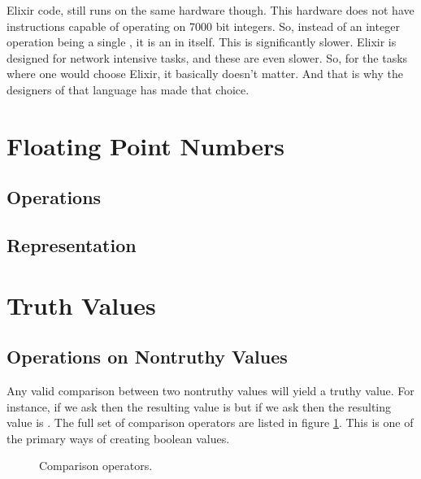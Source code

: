 Elixir code, still runs on the same hardware though. This hardware does not have instructions capable of operating on 7000 bit integers. So, instead of an integer operation being a single , it is an  in itself. This is significantly slower. Elixir is designed for network intensive tasks, and these are even slower. So, for the tasks where one would choose Elixir, it basically doesn't matter. And that is why the designers of that language has made that choice.

\section{Floating Point Numbers}
\label{primitives:float}

\subsection{Operations}
\subsection{Representation}
\csharpsubsection{\csharp}

\section{Truth Values}
\label{primitives:bools}


\subsection{Operations on Nontruthy Values}

Any valid comparison between two nontruthy values will yield a truthy value. For instance, if we ask  then the resulting value is  but if we ask  then the resulting value is . The full set of comparison operators are listed in figure \ref{fig:prim:bool:comparison}. This is one of the primary ways of creating boolean values.

\begin{figure}[tbp]
  
  \caption{Comparison operators.}
  \label{fig:prim:bool:comparison}
\end{figure}


